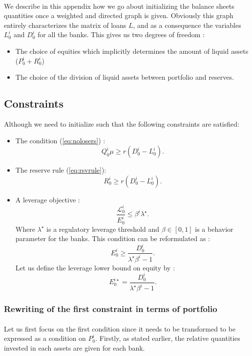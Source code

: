 \documentclass{article}
\begin{document}
\begin{appendices}
\paragraph{}
We describe in this appendix how we go about initializing the balance sheets quantities once a weighted and directed graph is given. Obviously this graph entirely characterizes the matrix of loans $L$, and as a consequence the variables $L_0^i$ and $D_0^i$ for all the banks. This gives us two degrees of freedom : 

\begin{itemize}
\item The choice of equities which implicitly determines the amount of liquid assets ($P_0^i + R_0^i$)
\item The choice of the division of liquid assets between portfolio and reserves.
\end{itemize}

\subsection{Constraints}

Although we need to initialize such that the following constraints are satisfied:
\begin{itemize}
\item The condition (\ref{eq:nolosers}) : $$Q_0^{i} \mu \geq r(D_0^i - L_0^i).$$
\item The reserve rule (\ref{eq:rsvrule}): $$R_0^i \geq r(D_0^i - L_0^i).$$
\item A leverage objective : $$ \frac{\mathcal{L}_0^i}{E_0^i} \leq \beta^i \lambda^{\star}.$$ Where $\lambda^{\star}$ is a regulatory leverage threshold and $\beta \in [0, 1]$ is a behavior parameter for the banks. This condition can be reformulated as : 
$$ E_0^i \geq \frac{D_0^i}{\lambda^{\star}\beta^i - 1}.$$
Let us define the leverage lower bound on equity by : 
$$ E_0^{i \star} = \frac{D_0^i}{\lambda^{\star}\beta^i - 1}.$$
\end{itemize}

\subsubsection{Rewriting of the first constraint in terms of portfolio}

\paragraph{}
Let us first focus on the first condition since it needs to be transformed to be expressed as a condition on $P_0^i$. Firstly, as stated earlier, the relative quantities invested in each assets are given for each bank. 


\end{appendices}
\end{document}

